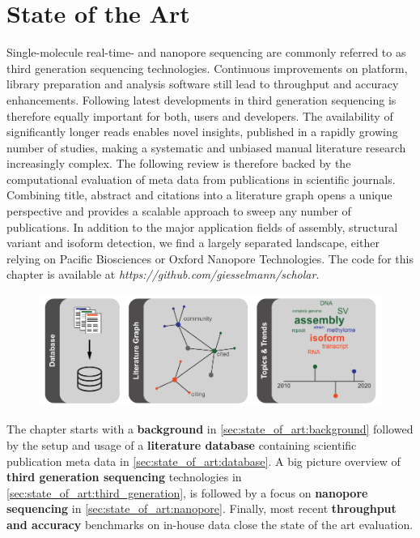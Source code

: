 \chapter{State of the Art}
\label{cha:state_of_art}

Single-molecule real-time- and nanopore sequencing are commonly referred to as third generation sequencing technologies.
Continuous improvements on platform, library preparation and analysis software still lead to throughput and accuracy enhancements.
Following latest developments in third generation sequencing is therefore equally important for both, users and developers.
The availability of significantly longer reads enables novel insights, published in a rapidly growing number of studies, making a systematic and unbiased manual literature research increasingly complex.
The following review is therefore backed by the computational evaluation of meta data from publications in scientific journals.
Combining title, abstract and citations into a literature graph opens a unique perspective and provides a scalable approach to sweep any number of publications.
In addition to the major application fields of assembly, structural variant and isoform detection, we find a largely separated landscape, either relying on Pacific Biosciences or Oxford Nanopore Technologies.
The code for this chapter is available at \textit{https://github.com/giesselmann/scholar}.

\begin{figure}[h]
	\centering
	\includegraphics[width=1.0\textwidth]{figures/state_of_art/GA.pdf}
	\label{fig:state_of_art:ga}
\end{figure}

The chapter starts with a \textbf{background} in \ref{sec:state_of_art:background} followed by the setup and usage of a \textbf{literature database} containing scientific publication meta data in \ref{sec:state_of_art:database}. A big picture overview of \textbf{third generation sequencing} technologies in \ref{sec:state_of_art:third_generation}, is followed by a focus on \textbf{nanopore sequencing} in \ref{sec:state_of_art:nanopore}. Finally, most recent \textbf{throughput and accuracy} benchmarks on in-house data close the state of the art evaluation.


